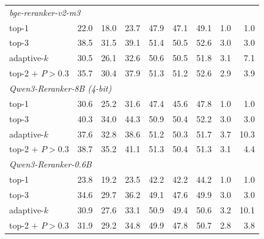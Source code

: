 \begin{table}[t]
\begin{tabular}{lrrrrrrrr}
\multicolumn{9}{l}{\textit{bge-reranker-v2-m3}} \\
\quad top-1 & 22.0 & 18.0 & 23.7 & 47.9 & 47.1 & 49.1 & 1.0 & 1.0 \\
\quad top-3 & 38.5 & 31.5 & 39.1 & 51.4 & 50.5 & 52.6 & 3.0 & 3.0 \\
\quad adaptive-$k$ & 30.5 & 26.1 & 32.6 & 50.6 & 50.5 & 51.8 & 3.1 & 7.1 \\
\quad top-2 $+$ $P>0.3$ & 35.7 & 30.4 & 37.9 & 51.3 & 51.2 & 52.6 & 2.9 & 3.9 \\
\multicolumn{9}{l}{\textit{Qwen3-Reranker-8B (4-bit)}} \\
\quad top-1 & 30.6 & 25.2 & 31.6 & 47.4 & 45.6 & 47.8 & 1.0 & 1.0 \\
\quad top-3 & 40.3 & 34.0 & 44.3 & 50.9 & 50.4 & 52.2 & 3.0 & 3.0 \\
\quad adaptive-$k$ & 37.6 & 32.8 & 38.6 & 51.2 & 50.3 & 51.7 & 3.7 & 10.3 \\
\quad top-2 $+$ $P>0.3$ & 38.7 & 35.2 & 41.1 & 51.3 & 50.4 & 51.3 & 3.1 & 4.4 \\
\multicolumn{9}{l}{\textit{Qwen3-Reranker-0.6B}} \\
\quad top-1 & 23.8 & 19.2 & 23.5 & 42.2 & 42.2 & 44.2 & 1.0 & 1.0 \\
\quad top-3 & 34.6 & 29.7 & 36.2 & 49.1 & 47.6 & 49.9 & 3.0 & 3.0 \\
\quad adaptive-$k$ & 30.9 & 27.6 & 33.1 & 50.9 & 49.4 & 50.6 & 3.2 & 10.1 \\
\quad top-2 $+$ $P>0.3$ & 31.9 & 29.2 & 34.8 & 49.9 & 47.8 & 50.7 & 2.8 & 3.8 \\
\bottomrule
\end{tabular}
\end{table}
